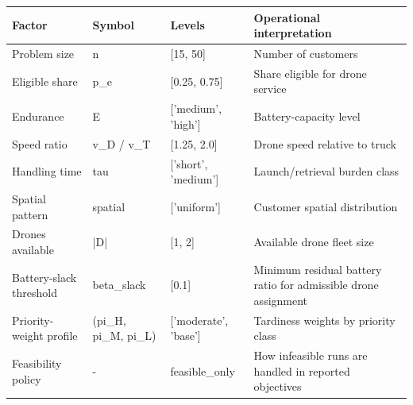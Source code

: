 \begin{tabular}{llll}
\toprule
Factor & Symbol & Levels & Operational interpretation \\
\midrule
Problem size & n & [15, 50] & Number of customers \\
Eligible share & p_e & [0.25, 0.75] & Share eligible for drone service \\
Endurance & E & ['medium', 'high'] & Battery-capacity level \\
Speed ratio & v_D / v_T & [1.25, 2.0] & Drone speed relative to truck \\
Handling time & tau & ['short', 'medium'] & Launch/retrieval burden class \\
Spatial pattern & spatial & ['uniform'] & Customer spatial distribution \\
Drones available & |D| & [1, 2] & Available drone fleet size \\
Battery-slack threshold & beta_slack & [0.1] & Minimum residual battery ratio for admissible drone assignment \\
Priority-weight profile & (pi_H, pi_M, pi_L) & ['moderate', 'base'] & Tardiness weights by priority class \\
Feasibility policy & - & feasible_only & How infeasible runs are handled in reported objectives \\
\bottomrule
\end{tabular}
